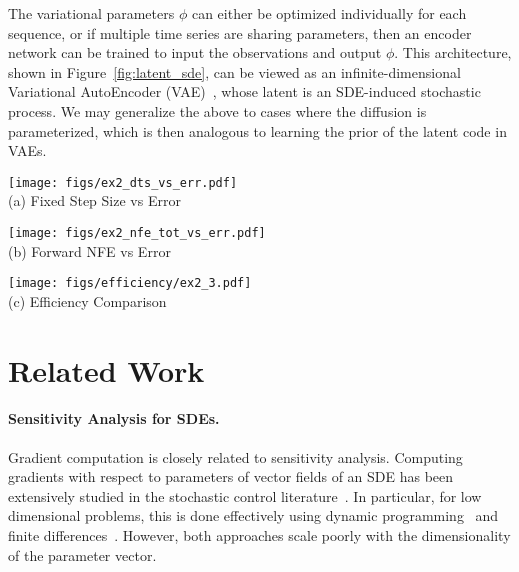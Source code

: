 \documentclass[twoside]{article}
\begin{document}
The variational parameters $\phi$ can either be optimized individually for each sequence, or if multiple time series are sharing parameters, then an encoder network can be trained to input the observations and output $\phi$.
This architecture, shown in Figure~\ref{fig:latent_sde}, can be viewed as an infinite-dimensional Variational AutoEncoder (VAE)~\cite{kingma2013auto,rezende2014stochastic}, whose latent is an SDE-induced stochastic process.
We may generalize the above to cases where the diffusion is parameterized, which is then analogous to learning the prior of the latent code in VAEs.
 \begin{figure*}[t]\label{fig:numerical_study}
\begin{minipage}[t]{0.33\linewidth}
\centering
{\texttt{[image: figs/ex2\_dts\_vs\_err.pdf]}} \\ \vspace{-0.10cm}
(a) \footnotesize{Fixed Step Size vs Error}
\end{minipage}
\begin{minipage}[t]{0.33\linewidth}
\centering
\texttt{[image: figs/ex2\_nfe\_tot\_vs\_err.pdf]} \\ \vspace{-0.10cm}
(b) \footnotesize{Forward NFE vs Error}
\end{minipage}
\begin{minipage}[t]{0.33\linewidth}
\centering
\texttt{[image: figs/efficiency/ex2\_3.pdf]} \\ \vspace{-0.10cm}
(c) \footnotesize{Efficiency Comparison}
\end{minipage}
\caption{
(a) Same fixed step size used in both forward and reverse simulation. Boxplot generated by repeating the experiment with different Brownian motion sample paths 64 times.
(b) Colors of dots represent tolerance levels and correspond to the colorbar on the right. 
Only \texttt{atol} was varied and \texttt{rtol} was set to $0$.
}
\end{figure*}

\section{Related Work}



\paragraph{Sensitivity Analysis for SDEs.}
Gradient computation is closely related to sensitivity analysis. 
Computing gradients with respect to parameters of vector fields of an SDE has been extensively studied in the stochastic control literature~\citep{kushner2013numerical}.
In particular, for low dimensional problems, this is done effectively using dynamic programming~\cite{baxterr2001infinite} and finite differences~\cite{glasserman1992some,l1994convergence}.
However, both approaches scale poorly with the dimensionality of the parameter vector. 
\end{document}
